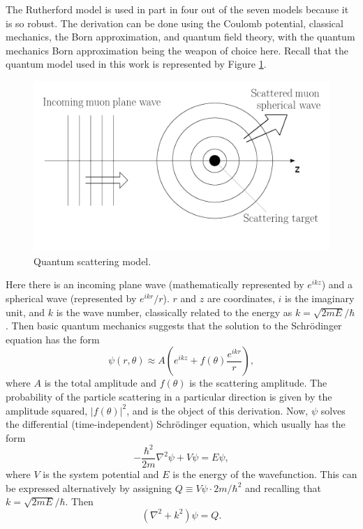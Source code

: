 The Rutherford model is used in part in four out of the seven models because it is so robust. The derivation can be done using the Coulomb potential, classical mechanics, the Born approximation, and quantum field theory, with the quantum mechanics Born approximation being the weapon of choice here. Recall that the quantum model used in this work is represented by Figure \ref{fig:qmscatteringmodel}.
\begin{figure}
  \centering
    \includegraphics[width=\textwidth]{Figures/scattering_model_2} 
  \caption{Quantum scattering model.}
  \label{fig:qmscatteringmodel}
\end{figure}
Here there is an incoming plane wave (mathematically represented by $e^{ikz}$) and a spherical wave (represented by $e^{ikr}/r$). $r$ and $z$ are coordinates, $i$ is the imaginary unit, and $k$ is the wave number, classically related to the energy as $k=\sqrt{2mE}/\hbar$. Then basic quantum mechanics suggests that the solution to the Schr\"{o}dinger equation has the form
\begin{equation}
\label{eqn:scatteringwavefunction}
\psi (r,\theta)\approx A \left(e^{ikz}+f(\theta)\frac{e^{ikr}}{r}\right),
\end{equation}
where $A$ is the total amplitude and $f(\theta)$ is the scattering amplitude. The probability of the particle scattering in a particular direction is given by the amplitude squared, $|f(\theta)|^2$, and is the object of this derivation. Now, $\psi$ solves the differential (time-independent) Schr\"{o}dinger equation, which usually has the form
\begin{equation} \nonumber
-\frac{\hbar^2}{2m}\nabla^2\psi+V\psi=E\psi,
\end{equation}
where $V$ is the system potential and $E$ is the energy of the wavefunction. This can be expressed alternatively by assigning $Q\equiv V\psi\cdot{2m}/{\hbar^2}$ and recalling that $k=\sqrt{2mE}/\hbar$. Then
%
\begin{equation}
\label{eqn:schrodinger}
(\nabla^2+k^2)\psi=Q.
\end{equation}

